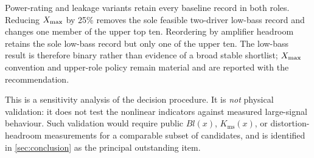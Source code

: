 Power-rating and leakage variants retain every baseline record in both
roles. Reducing $X_{\mathrm{max}}$ by 25\% removes the sole feasible two-driver
low-bass record and changes one member of the upper top ten. Reordering by
amplifier headroom retains the sole low-bass record but only one of the
upper ten. The low-bass result is therefore binary rather than evidence of
a broad stable shortlist; $X_{\mathrm{max}}$ convention and upper-role policy remain
material and are reported with the recommendation.

This is a sensitivity analysis of the decision procedure. It is
\emph{not} physical validation: it does not test the nonlinear indicators
against measured large-signal behaviour. Such validation would require
public $Bl(x)$, $K_{\mathrm{ms}}(x)$, or distortion-headroom measurements
for a comparable subset of candidates, and is identified in
\cref{sec:conclusion} as the principal outstanding item.
